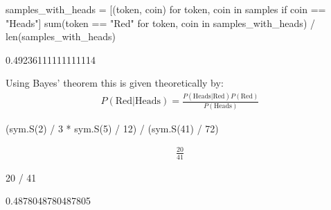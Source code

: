 \begin{pyin}
samples_with_heads = [(token, coin) for token, coin in samples if coin == "Heads"]
sum(token == "Red" for token, coin in samples_with_heads) / len(samples_with_heads)
\end{pyin}





\begin{raw}
0.49236111111111114
\end{raw}






Using Bayes’ theorem this is given theoretically by:
\begin{equation*}
\begin{split}
    P(\text{Red}|\text{Heads}) = \frac{P(\text{Heads} | \text{Red})P(\text{Red})}{P(\text{Heads})}
\end{split}
\end{equation*}



\begin{pyin}
(sym.S(2) / 3 * sym.S(5) / 12) / (sym.S(41) / 72)
\end{pyin}




\begin{equation*}
\begin{split}\displaystyle \frac{20}{41}\end{split}
\end{equation*}







\begin{pyin}
20 / 41
\end{pyin}





\begin{raw}
0.4878048780487805
\end{raw}







